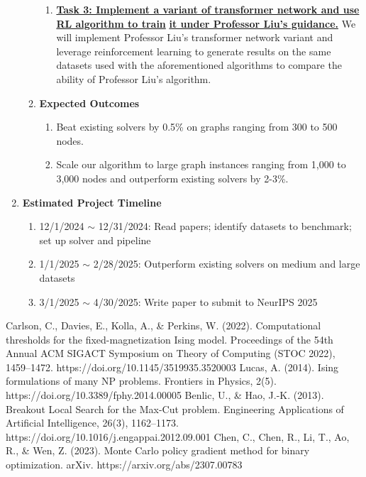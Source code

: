 \documentclass{article}
\begin{document}
\begin{enumerate}
\begin{enumerate}
\begin{enumerate}
		\item \textbf{\underline{Task 3: Implement a variant of transformer network and use RL algorithm to train}}
		\newline
		\textbf{\underline{it under Professor Liu's guidance.}} We will implement Professor Liu's transformer network variant and leverage reinforcement learning to generate results on the same datasets used with the aforementioned algorithms to compare the ability of Professor Liu's algorithm.

	\end{enumerate}

	\item \textbf{Expected Outcomes}
	
	\begin{enumerate}
		\item Beat existing solvers by 0.5\% on graphs ranging from 300 to 500 nodes.
		\item Scale our algorithm to large graph instances ranging from 1,000 to 3,000 nodes and outperform existing solvers by 2-3\%.
	\end{enumerate}

\end{enumerate}

\item \textbf{Estimated Project Timeline}
\begin{enumerate}
	\item 12/1/2024 $\sim$ 12/31/2024: Read papers; identify datasets to benchmark; set up solver and pipeline
	\item 1/1/2025 $\sim$ 2/28/2025: Outperform existing solvers on medium and large datasets
	\item 3/1/2025 $\sim$ 4/30/2025: Write paper to submit to NeurIPS 2025
\end{enumerate}

\end{enumerate}

\begin{thebibliography}{00}
Carlson, C., Davies, E., Kolla, A., \& Perkins, W. (2022). Computational thresholds for the fixed-magnetization Ising model. Proceedings of the 54th Annual ACM SIGACT Symposium on Theory of Computing (STOC 2022), 1459–1472. https://doi.org/10.1145/3519935.3520003
Lucas, A. (2014). Ising formulations of many NP problems. Frontiers in Physics, 2(5). https://doi.org/10.3389/fphy.2014.00005
Benlic, U., \& Hao, J.-K. (2013). Breakout Local Search for the Max-Cut problem. Engineering Applications of Artificial Intelligence, 26(3), 1162–1173. https://doi.org/10.1016/j.engappai.2012.09.001
Chen, C., Chen, R., Li, T., Ao, R., \& Wen, Z. (2023). Monte Carlo policy gradient method for binary optimization. arXiv. https://arxiv.org/abs/2307.00783


\end{thebibliography}
\end{document}
